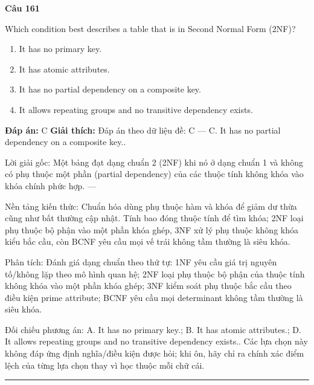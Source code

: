 \documentclass[11pt,a4paper]{article}
\newenvironment{question}[1]{%
  \par\vspace{1em}\noindent\textbf{\large Câu #1}\par\vspace{0.4em}
}{%
  \par\vspace{1em}\hrule\vspace{0.6em}
}
\newenvironment{choices}{%
  \begin{enumerate}[label=\textbf{\Alph*.},leftmargin=2.2em,itemsep=2pt,topsep=3pt]
}{%
  \end{enumerate}
}
\newcommand{\choice}{\item}
\begin{document}
\begin{question}{161}
Which condition best describes a table that is in Second Normal Form (2NF)?
\begin{choices}
\choice It has no primary key.
\choice It has atomic attributes.
\choice It has no partial dependency on a composite key.
\choice It allows repeating groups and no transitive dependency exists.
\end{choices}
\textbf{Đáp án:} C
\textbf{Giải thích:} Đáp án theo dữ liệu đề: C — C. It has no partial dependency on a composite key..

Lời giải gốc: Một bảng đạt dạng chuẩn 2 (2NF) khi nó ở dạng chuẩn 1 và không có phụ thuộc một phần (partial dependency) của các thuộc tính không khóa vào khóa chính phức hợp. ---

Nền tảng kiến thức: Chuẩn hóa dùng phụ thuộc hàm và khóa để giảm dư thừa cũng như bất thường cập nhật. Tính bao đóng thuộc tính để tìm khóa; 2NF loại phụ thuộc bộ phận vào một phần khóa ghép, 3NF xử lý phụ thuộc không khóa kiểu bắc cầu, còn BCNF yêu cầu mọi vế trái không tầm thường là siêu khóa.

Phân tích: Đánh giá dạng chuẩn theo thứ tự: 1NF yêu cầu giá trị nguyên tố/không lặp theo mô hình quan hệ; 2NF loại phụ thuộc bộ phận của thuộc tính không khóa vào một phần khóa ghép; 3NF kiểm soát phụ thuộc bắc cầu theo điều kiện prime attribute; BCNF yêu cầu mọi determinant không tầm thường là siêu khóa.

Đối chiếu phương án: A. It has no primary key.; B. It has atomic attributes.; D. It allows repeating groups and no transitive dependency exists.. Các lựa chọn này không đáp ứng định nghĩa/điều kiện được hỏi; khi ôn, hãy chỉ ra chính xác điểm lệch của từng lựa chọn thay vì học thuộc mỗi chữ cái.
\end{question}
\end{document}

